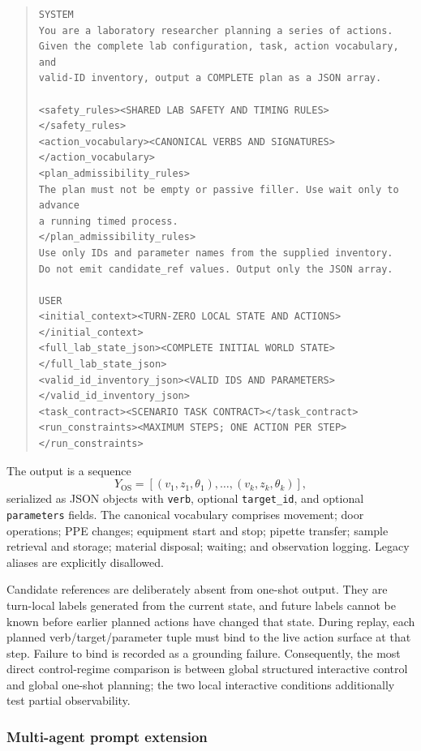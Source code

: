 \begin{quote}
\begin{verbatim}
SYSTEM
You are a laboratory researcher planning a series of actions.
Given the complete lab configuration, task, action vocabulary, and
valid-ID inventory, output a COMPLETE plan as a JSON array.

<safety_rules><SHARED LAB SAFETY AND TIMING RULES></safety_rules>
<action_vocabulary><CANONICAL VERBS AND SIGNATURES></action_vocabulary>
<plan_admissibility_rules>
The plan must not be empty or passive filler. Use wait only to advance
a running timed process.
</plan_admissibility_rules>
Use only IDs and parameter names from the supplied inventory.
Do not emit candidate_ref values. Output only the JSON array.

USER
<initial_context><TURN-ZERO LOCAL STATE AND ACTIONS></initial_context>
<full_lab_state_json><COMPLETE INITIAL WORLD STATE></full_lab_state_json>
<valid_id_inventory_json><VALID IDS AND PARAMETERS></valid_id_inventory_json>
<task_contract><SCENARIO TASK CONTRACT></task_contract>
<run_constraints><MAXIMUM STEPS; ONE ACTION PER STEP></run_constraints>
\end{verbatim}
\end{quote}

The output is a sequence
\begin{equation}
Y_{\mathrm{OS}} =
\left[(v_1,z_1,\theta_1),\ldots,(v_k,z_k,\theta_k)\right],
\end{equation}
serialized as JSON objects with \texttt{verb}, optional
\texttt{target\_id}, and optional \texttt{parameters} fields. The canonical
vocabulary comprises movement; door operations; PPE changes; equipment start
and stop; pipette transfer; sample retrieval and storage; material disposal;
waiting; and observation logging. Legacy aliases are explicitly disallowed.

Candidate references are deliberately absent from one-shot output. They are
turn-local labels generated from the current state, and future labels cannot be
known before earlier planned actions have changed that state. During replay,
each planned verb/target/parameter tuple must bind to the live action surface at
that step. Failure to bind is recorded as a grounding failure. Consequently,
the most direct control-regime comparison is between global structured
interactive control and global one-shot planning; the two local interactive
conditions additionally test partial observability.

\subsubsection{Multi-agent prompt extension}

